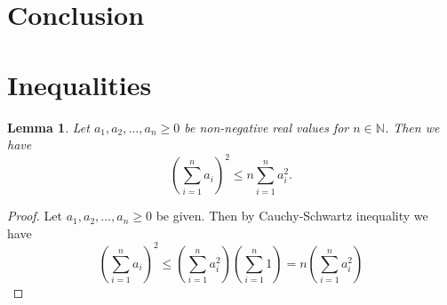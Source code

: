 \documentclass[12pt]{article}
\newtheorem{lemma}[theorem]{Lemma}
\theoremstyle{definition}
\numberwithin{equation}{section}
\newcommand{\N}{\mathbb{N}}
\begin{document}
\section{Conclusion}



\printbibliography

\appendix
\section{Inequalities}
\begin{lemma}
  \label{lemma:inequality}
  Let $a_1,a_2,\dots,a_n \geq 0$ be non-negative real values for $n \in \N$. Then we have
  \begin{equation*}
    (\sum_{i=1}^na_i)^2 \leq n \sum_{i=1}^n a_i^2.
  \end{equation*}
\end{lemma}
\begin{proof}
  Let $a_1,a_2, \dots, a_n \geq 0$ be given. Then by Cauchy-Schwartz inequality we have
  \begin{equation*}
    (\sum_{i=1}^n a_i)^2 \leq (\sum_{i=1}^n a_i^2)(\sum_{i=1}^n 1) = n(\sum_{i=1}^n a_i^2)
  \end{equation*}
\end{proof}
\end{document}
